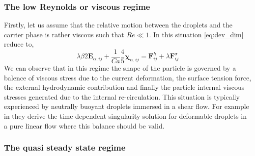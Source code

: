 \subsubsection{The low Reynolds or viscous regime}

Firstly, let us assume that the relative motion between the droplets and the carrier phase is rather viscous such that $Re \ll 1$.
In this situation \ref{eq:dev_dim} reduce to, 
\begin{equation*}
    \lambda \beta 2 \textbf{E}_{\alpha,ij}
    + \frac{1}{Ca}
    \frac{4  }{5} \bm\chi_{\alpha,ij}
    = \textbf{F}_{ij}^h 
    + \lambda \textbf{F}_{ij}^{\sigma}
    \label{eq:stokes_shape}
\end{equation*}
We can observe that in this regime the shape of the particle is governed by a balence of viscous stress due to the current deformation, the surface tension force, the external hydrodynamic contribution and finally the particle internal viscous stresses generated due to the internal re-circulation. 
This situation is typically experienced by neutrally buoyant droplets immersed in a shear flow. 
For example in \citet[Chapter 7]{leal2007advanced} they derive the time dependent singularity solution for deformable droplets in a pure linear flow where this balance should be valid. 

\subsubsection{The quasi steady state regime}

